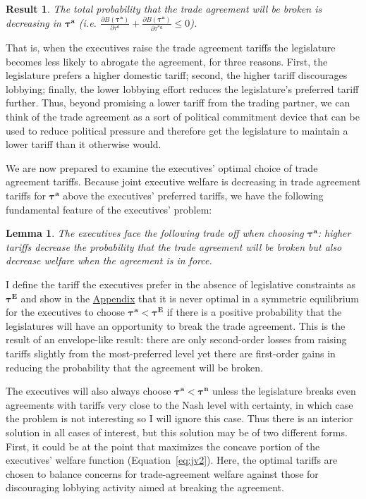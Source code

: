 \documentclass[10pt]{article}
\newtheorem{lemma}{Lemma}
\newtheorem{result}{Result}
\newcommand{\bta}{\bm{\tau^a}}
\newcommand{\btn}{\bm{\tau^n}}
\begin{document}
\begin{result}
	The total probability that the trade agreement will be broken is decreasing in $\bta$ (i.e. $\frac{\partial B(\bta)}{\partial  \tau^a} + \frac{\partial B(\bta)}{\partial  \tau^{*a}} \leq 0$).
	\label{res:bcomB}
\end{result}

\noindent That is, when the executives raise the trade agreement tariffs the legislature becomes less likely to abrogate the agreement, for three reasons. First, the legislature prefers a higher domestic tariff; second, the higher tariff discourages lobbying; finally, the lower lobbying effort reduces the legislature's preferred tariff further. Thus, beyond promising a lower tariff from the trading partner, we can think of the trade agreement as a sort of political commitment device that can be used to reduce political pressure and therefore get the legislature to maintain a lower tariff than it otherwise would.

We are now prepared to examine the executives' optimal choice of trade agreement tariffs. Because joint executive welfare is decreasing in trade agreement tariffs for $\bta$ above the executives' preferred tariffs, we have the following fundamental feature of the executives' problem:
\begin{lemma}
  The executives face the following trade off when choosing $\bta$: higher tariffs decrease the probability that the trade agreement will be broken but also decrease welfare when the agreement is in force.
  \label{res:to}
\end{lemma}
I define the tariff the executives prefer in the absence of legislative constraints as $\bm{\tau^E}$ and show in the \hyperlink{int_soln}{Appendix} that it is never optimal in a symmetric equilibrium for the executives to choose $\bm{\tau^a} < \bm{\tau^E}$ if there is a positive probability that the legislatures will have an opportunity to break the trade agreement. This is the result of an envelope-like result: there are only second-order losses from raising tariffs slightly from the most-preferred level yet there are first-order gains in reducing the probability that the agreement will be broken.

The executives will also always choose $\bta < \btn$ unless the legislature breaks even agreements with tariffs very close to the Nash level with certainty, in which case the problem is not interesting so I will ignore this case. Thus there is an interior solution in all cases of interest, but this solution may be of two different forms. First, it could be at the point that maximizes the concave portion of the executives' welfare function (Equation~\ref{eq:jv2}). Here, the optimal tariffs are chosen to balance concerns for trade-agreement welfare against those for discouraging lobbying activity aimed at breaking the agreement.
\end{document}
